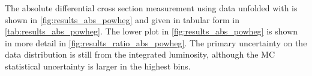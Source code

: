 


The absolute differential cross section measurement using data unfolded with
\POWHEG is shown in \cref{fig:results_abs_powheg} and given in tabular form
in \cref{tab:results_abs_powheg}. The lower plot in
\cref{fig:results_abs_powheg} is shown in more detail in
\cref{fig:results_ratio_abs_powheg}. The primary uncertainty on the data
distribution is still from the integrated luminosity, although the MC
statistical uncertainty is larger in the highest \phistar bins.



